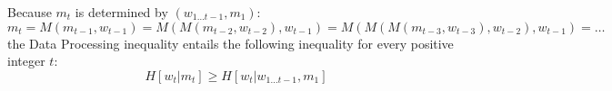 \documentclass[11pt,letterpaper]{article}
\newcounter{theorem}
\newtheorem{lemma}[theorem]{Lemma}
\begin{document}
%
%
%
Because $m_t$ is determined by $(w_{1 \dots t-1}, m_1)$:
\begin{equation}
	m_t = M(m_{t-1}, w_{t-1}) = M(M(m_{t-2}, w_{t-2}), w_{t-1}) = M(M(M(m_{t-3}, w_{t-3}), w_{t-2}), w_{t-1}) = \dots
\end{equation}
the Data Processing inequality entails the following inequality for every positive integer $t$:
\begin{equation}
	H[w_t | m_t] \geq H[w_t|w_{1 \dots t-1}, m_1]
\end{equation}

\end{document}
